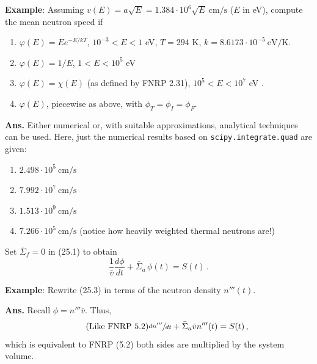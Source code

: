 \documentclass[compact]{ne630handout}
\begin{document}
\begin{handoutflow}
\vspace{5pt} 

 

{\bf Example}:  Assuming $v(E) = a\sqrt{E} = 1.384\cdot 10^{6}\sqrt{E}~\si{\centi\meter\per\second}$ ($E$ in \si{\electronvolt}), compute the mean neutron speed if
\begin{enumerate}[label=(\alph*)]
 \item $\varphi(E) = E e^{-E/kT}$, $10^{-3} < E < 1$ eV, $T = 294$ K, $k = 8.6173\cdot 10^{-5}~\si{\electronvolt\per\kelvin}$.
 \item $\varphi(E) = 1/E$, $1 < E < 10^5$ eV
 \item $\varphi(E) = \chi(E)$ (as defined by FNRP 2.31),  $10^5 < E < 10^7$ eV .
 \item $\varphi(E)$, piecewise as above, with $\phi_T=\phi_I=\phi_F$.
\end{enumerate}

{\color{wcprimary}\small
  \textbf{Ans.} Either numerical or, with suitable approximations, analytical techniques can be used.  Here, just the numerical
  results based on \nolinkurl{scipy.integrate.quad} are given:
\begin{enumerate}[label=(\alph*)]
 \item $2.498\cdot 10^{5}~\si{\centi\meter\per\second}$
 \item $7.992\cdot 10^{7}~\si{\centi\meter\per\second}$
 \item $1.513\cdot 10^{9}~\si{\centi\meter\per\second}$
 \item $7.266\cdot 10^{5}~\si{\centi\meter\per\second}$ ({\footnotesize notice how heavily weighted thermal neutrons are!})
\end{enumerate}
}

 
\newpage 


Set $\bar\Sigma_f=0$ in (25.1) to obtain
\begin{equation*}
\tag{25.3}
\frac{1}{\bar v}\frac{d\phi}{dt} + \bar\Sigma_a\,\phi(t) = S(t)\, .
\end{equation*}




{\bf Example}: Rewrite (25.3) in terms of the neutron density $n'''(t)$.

\textcolor{wcprimary}{{\small
{\bf Ans.}
Recall $\phi = n''' \bar{v}$.  Thus,
\begin{equation*}
\tag{Like FNRP 5.2}
 \sfrac{dn'''}{dt} + \bar\Sigma_a \bar{v} n'''(t)  = S(t) \, ,
\end{equation*}
which is equivalent to FNRP (5.2) both sides are multiplied by the system volume.
}}





\end{handoutflow}
\end{document}
